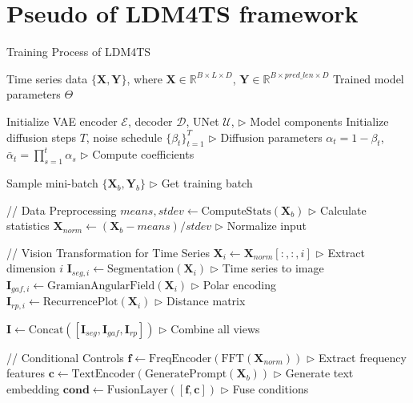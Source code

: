 \newpage
\section{Pseudo of LDM4TS framework}
\begin{algorithm}[H]
\caption{Training Process of LDM4TS}
\begin{algorithmic}[1]
\REQUIRE Time series data $\{\mathbf{X}, \mathbf{Y}\}$, where $\mathbf{X} \in \mathbb{R}^{B\times L\times D}$, $\mathbf{Y} \in \mathbb{R}^{B\times pred\_len\times D}$
\ENSURE Trained model parameters $\Theta$

\STATE Initialize VAE encoder $\mathcal{E}$, decoder $\mathcal{D}$, UNet $\mathcal{U}$, \hfill $\triangleright$ Model components
\STATE Initialize diffusion steps $T$, noise schedule $\{\beta_t\}_{t=1}^T$ \hfill $\triangleright$ Diffusion parameters
\STATE $\alpha_t = 1 - \beta_t$, $\bar{\alpha}_t = \prod_{s=1}^t \alpha_s$ \hfill $\triangleright$ Compute coefficients

    \STATE Sample mini-batch $\{\mathbf{X}_b, \mathbf{Y}_b\}$ \hfill $\triangleright$ Get training batch
    
    \STATE // Data Preprocessing
    \STATE $means, stdev \gets \text{ComputeStats}(\mathbf{X}_b)$ \hfill $\triangleright$ Calculate statistics
    \STATE $\mathbf{X}_{norm} \gets (\mathbf{X}_b - means) / stdev$ \hfill $\triangleright$ Normalize input
    
    \STATE // Vision Transformation for Time Series
        \STATE $\mathbf{X}_i \gets \mathbf{X}_{norm}[:,:,i]$ \hfill $\triangleright$ Extract dimension $i$ \;
        \STATE $\mathbf{I}_{seg,i} \gets \text{Segmentation}(\mathbf{X}_i)$ \hfill $\triangleright$ Time series to image \;
        \STATE $\mathbf{I}_{gaf,i} \gets \text{GramianAngularField}(\mathbf{X}_i)$ \hfill $\triangleright$ Polar encoding \;
        \STATE $\mathbf{I}_{rp,i} \gets \text{RecurrencePlot}(\mathbf{X}_i)$ \hfill $\triangleright$ Distance matrix
    \ENDFOR
    
    \STATE $\mathbf{I} \gets \text{Concat}([\mathbf{I}_{seg}, \mathbf{I}_{gaf}, \mathbf{I}_{rp}])$ \hfill $\triangleright$ Combine all views
    
    \STATE // Conditional Controls
    \STATE $\mathbf{f} \gets \text{FreqEncoder}(\text{FFT}(\mathbf{X}_{norm}))$ \hfill $\triangleright$ Extract frequency features
    \STATE $\mathbf{c} \gets \text{TextEncoder}(\text{GeneratePrompt}(\mathbf{X}_b))$ \hfill $\triangleright$ Generate text embedding
    \STATE $\mathbf{cond} \gets \text{FusionLayer}([\mathbf{f}, \mathbf{c}])$ \hfill $\triangleright$ Fuse conditions


\end{algorithmic}
\end{algorithm}
